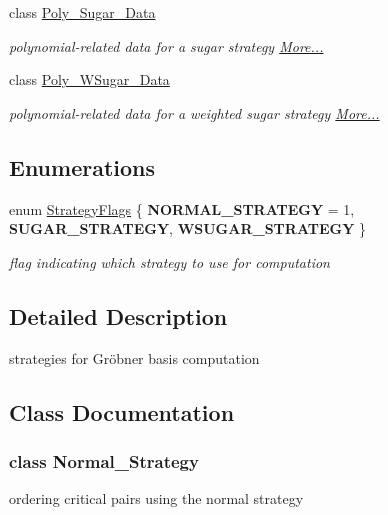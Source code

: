 \begin{DoxyCompactItemize}
class \hyperlink{group__strategygroup_class_poly___sugar___data}{Poly\+\_\+\+Sugar\+\_\+\+Data}
\begin{DoxyCompactList}\small\item\em polynomial-\/related data for a sugar strategy  \hyperlink{group__strategygroup_class_poly___sugar___data}{More...}\end{DoxyCompactList}\item 
class \hyperlink{group__strategygroup_class_poly___w_sugar___data}{Poly\+\_\+\+W\+Sugar\+\_\+\+Data}
\begin{DoxyCompactList}\small\item\em polynomial-\/related data for a weighted sugar strategy  \hyperlink{group__strategygroup_class_poly___w_sugar___data}{More...}\end{DoxyCompactList}\end{DoxyCompactItemize}
\subsection*{Enumerations}
\begin{DoxyCompactItemize}
\item 
enum \hyperlink{group__strategygroup_ga0ee6c8e033547330e6b89929730007f4}{Strategy\+Flags} \{ {\bfseries N\+O\+R\+M\+A\+L\+\_\+\+S\+T\+R\+A\+T\+E\+GY} = 1, 
{\bfseries S\+U\+G\+A\+R\+\_\+\+S\+T\+R\+A\+T\+E\+GY}, 
{\bfseries W\+S\+U\+G\+A\+R\+\_\+\+S\+T\+R\+A\+T\+E\+GY}
 \}\begin{DoxyCompactList}\small\item\em flag indicating which strategy to use for computation \end{DoxyCompactList}
\end{DoxyCompactItemize}


\subsection{Detailed Description}
strategies for Gr\"{o}bner basis computation 



\subsection{Class Documentation}
\label{class_normal___strategy}
\subsubsection{class Normal\+\_\+\+Strategy}
ordering critical pairs using the normal strategy 

